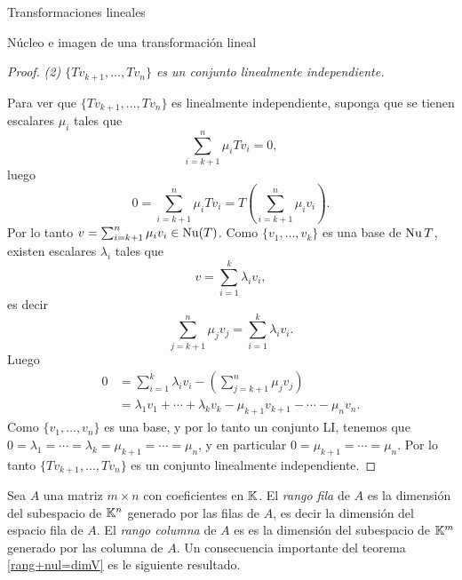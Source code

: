 \begin{chapter}{Transformaciones lineales}
\begin{section}{N\'ucleo e imagen de una transformaci\'on lineal}
\begin{proof}
             \textit{(2) $\{Tv_{k+1},\ldots,Tv_n \}$ es un conjunto linealmente independiente.}
             
             Para ver que  $\{Tv_{k+1},\ldots,Tv_n \}$ es linealmente independiente, suponga que se tienen escalares $\mu_i$ tales que
             $$
             \sum_{i=k+1}^n \mu_i Tv_i = 0,
             $$
             luego
             $$
             0 = \sum_{i=k+1}^n \mu_i Tv_i =   T(\sum_{i=k+1}^n\mu_iv_i).  
             $$
             Por lo tanto $v =\sum_{i=k+1}^n \mu_iv_i\in \operatorname{Nu}(T)$. Como  $\{v_1,\ldots,v_k \}$ es una base de $\operatorname{Nu} T$,  existen escalares $\lambda_i$ tales que
             $$
             v =  \sum_{i=1}^k \lambda_i v_i,
             $$
             es decir
             $$
             \sum_{j=k+1}^n \mu_jv_j =  \sum_{i=1}^k \lambda_i v_i.
             $$
             Luego
             \begin{align*}
                     0 &= \sum_{i=1}^k \lambda_i v_i - (\sum_{j=k+1}^n \mu_jv_j) \\
                     &= \lambda_1 v_1 + \cdots +\lambda_k v_k - \mu_{k+1}v_{k+1} -\cdots-\mu_nv_n.
             \end{align*}
             Como $\{v_1,\ldots,v_n \}$ es una base, y por lo tanto un conjunto LI,  tenemos que  $0=\lambda_1=\cdots=\lambda_k=\mu_{k+1}=\cdots=\mu_n$, y  en particular $0=\mu_{k+1}=\cdots=\mu_n$. Por lo tanto $\{Tv_{k+1},\ldots,Tv_n \}$ es un conjunto linealmente independiente.		  
        \end{proof}
        
    
        
        Sea $A$ una matriz $m \times n$ con coeficientes  en $\mathbb K$. El  \textit{rango fila} de $A$ es la dimensión del subespacio de $\mathbb K^n$ generado por las filas de $A$, es decir la dimensión del espacio fila de $A$. El \textit{rango columna} de $A$  es es la dimensión del subespacio de $\mathbb K^m$ generado por las columna de $A$. Un  consecuencia importante del teorema \ref{rang+nul=dimV} es le siguiente resultado. 
        

\end{section}
\end{chapter}
